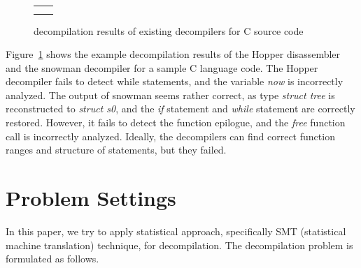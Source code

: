 \documentclass[senior,final,11pt]{iscs-thesis}
\begin{document}



\begin{figure}
	\begin{tabular}{cc}
		\begin{minipage}[c]{0.5\hsize}
			
		\end{minipage}
		\\
		\begin{minipage}[c]{0.5\hsize}
			
		\end{minipage}
		\begin{minipage}[c]{0.5\hsize}
			
		\end{minipage}
	\end{tabular}
	\vspace*{-0.6cm}
	\caption{ decompilation results of existing decompilers for C source code}
	\label{fig:cw}
\end{figure}


Figure~\ref{fig:cw} shows the example decompilation results of the Hopper disassembler and the snowman decompiler 
for a sample C language code.
The Hopper decompiler fails to detect while statements, and the variable {\sl now} is incorrectly analyzed.
The output of snowman seems rather correct, as type {\sl struct tree} is reconstructed to {\sl struct s0}, 
and the {\sl if} statement and {\sl while} statement are correctly restored. 
However, it fails to detect the function epilogue, and the {\sl free} function call is incorrectly analyzed.
Ideally, the decompilers can find correct function ranges and structure of statements, but they failed.


\section{Problem Settings}

In this paper, we try to apply statistical approach, specifically SMT (statistical machine translation) technique, for decompilation.
The decompilation problem is formulated as follows. 
\end{document}
